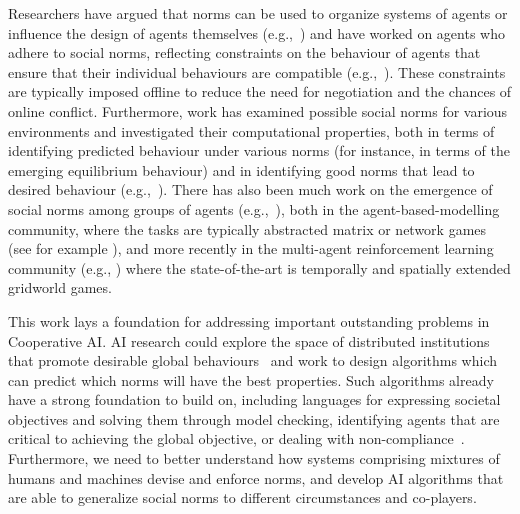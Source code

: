\documentclass[11pt, a4paper, logo, onecolumn, nonumbering]{deepmind}
\begin{document}
Researchers have argued that norms can be used to organize systems of agents or influence the design of agents themselves (e.g.,~\cite{castelfranchi1999deliberative,dignum1999autonomous,vazquez2005organizing}) and 
have worked on agents who adhere to social norms,
reflecting constraints on the behaviour of agents that ensure that their individual behaviours are compatible (e.g.,~\cite{shoham1995social,conte1998autonomous,conte1995understanding,shoham1992synthesis}).
These constraints are typically imposed offline to reduce the need for negotiation and the chances of online conflict.
Furthermore, work has examined possible social norms for various environments and investigated their computational properties, both in terms of identifying predicted behaviour under various norms (for instance, in terms of the emerging equilibrium behaviour) and in identifying good norms that lead to desired behaviour (e.g.,~\cite{dignum2002desires,horling2004survey,artikis2009specifying,y2006normative,werfel2014designing,koster2020silly}). 
There has also been much work on the emergence of social norms among groups of agents (e.g.,~\cite{morris2019norm}), both in the agent-based-modelling community, where the tasks are typically abstracted matrix or network games (see for example \cite{yu2013,villatoro2013robust}), and more recently in the multi-agent reinforcement learning community (e.g., \cite{DBLP:journals/corr/abs-1902-03185, DBLP:journals/corr/abs-1803-08884, taylor2009transfer, hausknecht2015deep, pareda2017, koster2020silly}) where the state-of-the-art is temporally and spatially extended gridworld games. 


This work lays a foundation for addressing important outstanding problems in Cooperative AI.
AI research could explore the space of distributed institutions that promote desirable global behaviours~\cite{Hadfield2020coopAI,criado2011open} and work to design algorithms which can predict which norms will have the best properties. 
Such algorithms already have a strong foundation to build on,
including languages for expressing societal objectives and solving them through model checking, identifying agents that are critical to achieving the global objective, or dealing with non-compliance~\cite{grossi2007designing,aagotnes2007normative,aagotnes2009power,bench2017norms}.%
Furthermore, we need to better understand how systems comprising mixtures of humans and machines devise and enforce norms, and  develop AI algorithms that are able to generalize social norms to different circumstances and co-players.
\end{document}
